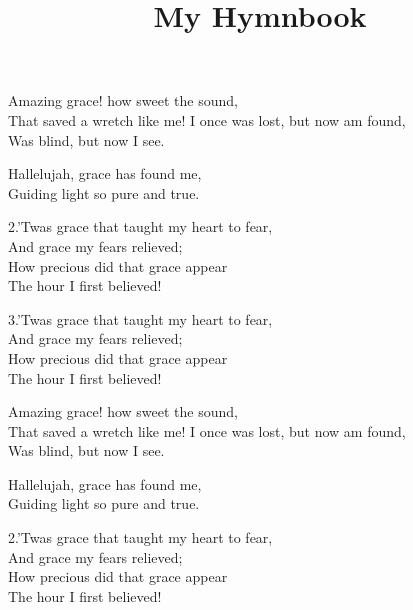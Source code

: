 \documentclass[12pt]{article}
\title{My Hymnbook}
\author{}
\date{}
\begin{document}
\maketitle
\newpage


\begin{stanza}
Amazing grace! how sweet the sound,\\
That saved a wretch like me!
I once was lost, but now am found,\\
Was blind, but now I see.
\end{stanza}

\begin{chorus}
Hallelujah, grace has found me,\\
Guiding light so pure and true.
\end{chorus}

\begin{stanza}
2.’Twas grace that taught my heart to fear,\\
And grace my fears relieved;\\
How precious did that grace appear\\
The hour I first believed!
\end{stanza}

\begin{stanza}
3.’Twas grace that taught my heart to fear,\\
And grace my fears relieved;\\
How precious did that grace appear\\
The hour I first believed!
\end{stanza}

\HymnBreak


\begin{stanza}
Amazing grace! how sweet the sound,\\
That saved a wretch like me!
I once was lost, but now am found,\\
Was blind, but now I see.
\end{stanza}

\begin{chorus}
Hallelujah, grace has found me,\\
Guiding light so pure and true.
\end{chorus}

\begin{stanza}
2.’Twas grace that taught my heart to fear,\\
And grace my fears relieved;\\
How precious did that grace appear\\
The hour I first believed!
\end{stanza}
\end{document}
